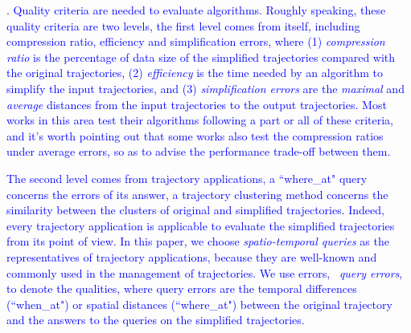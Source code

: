 {\stitle{\textcolor{blue}{Quality criteria}}.
\textcolor{blue}{Quality criteria are needed to evaluate \lsa algorithms. Roughly speaking, these quality criteria are two levels, the first level comes from \lsa itself, including compression ratio, efficiency and simplification errors, where
	(1) \emph{compression ratio} is the percentage of data size of the simplified trajectories compared with the original trajectories,
	(2) \emph{efficiency} is the time needed by an \lsa algorithm to simplify the input trajectories, and
	(3) \emph{simplification errors} are the \emph{maximal} and \emph{average} distances from the input trajectories to the output trajectories.
Most works in this area test their algorithms following a part or all of these criteria, and it's worth pointing out that some works \cite{Zhang:Evaluation,Cao:Dots,Wu:Graph} also test the compression ratios under average errors, so as to advise the performance trade-off between them.}
	
	
\textcolor{blue}{The second level comes from trajectory applications, \eg a ``where\_at" query \cite{Cao:Spatio,Trajcevski:Uncertainty} concerns the errors of its answer, a trajectory clustering method concerns the similarity between the clusters of original and simplified trajectories. Indeed, every trajectory application is applicable to evaluate the simplified trajectories from its point of view.}	
%
\textcolor{blue}{In this paper, we choose \emph{spatio-temporal queries} \cite{Cao:Spatio,Trajcevski:Uncertainty} as the representatives of trajectory applications, because they are well-known and commonly used in the management of trajectories.}
%
\textcolor{blue}{We use errors, \ie~\emph{query errors}, to denote the qualities, where query errors are the temporal differences (\eg ``when\_at") or spatial distances (\eg ``where\_at") between the original trajectory and the answers to the queries on the simplified trajectories.}






}
